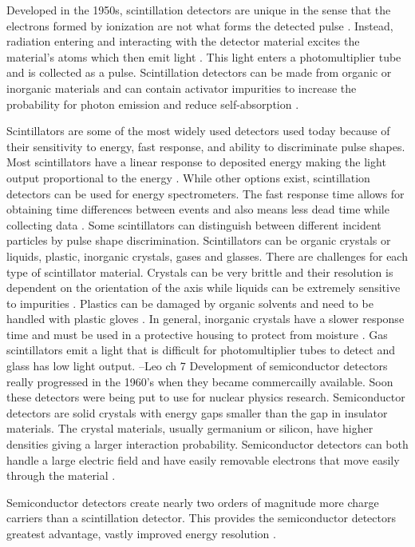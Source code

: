 Developed in the 1950s, scintillation detectors are unique in the sense that the electrons formed by ionization are not what forms the detected pulse \cite{KK88}. Instead, radiation entering and interacting with the detector material excites the material's atoms which then emit light \cite{KK88}. This light enters a photomultiplier tube and is collected as a pulse. Scintillation detectors can be made from organic or inorganic materials and can contain activator impurities to increase the probability for photon emission and reduce self-absorption \cite{KK88}. 

Scintillators are some of the most widely used detectors used today because of their sensitivity to energy, fast response, and ability to discriminate pulse shapes. Most scintillators have a linear response to deposited energy making the light output proportional to the energy \cite{Leo94}. While other options exist, scintillation detectors can be used for energy spectrometers. The fast response time allows for obtaining time differences between events and also means less dead time while collecting data \cite{Leo94}. Some scintillators can distinguish between different incident particles by pulse shape discrimination. Scintillators can be organic crystals or liquids, plastic, inorganic crystals, gases and glasses. There are challenges for each type of scintillator material. Crystals can be very brittle and their resolution is dependent on the orientation of the axis while liquids can be extremely sensitive to impurities \cite{Leo94}. Plastics can be damaged by organic solvents and need to be handled with plastic gloves \cite{Leo94}. In general, inorganic crystals have a slower response time and must be used in a protective housing to protect from moisture \cite{Leo94}. Gas scintillators emit a light that is difficult for photomultiplier tubes to detect and glass has low light output.
--Leo ch 7
Development of semiconductor detectors really progressed in the 1960's when they became commercailly available. Soon these detectors were being put to use for nuclear physics research. Semiconductor detectors are solid crystals with energy gaps smaller than the gap in insulator materials. The crystal materials, usually germanium or silicon, have higher densities giving a larger interaction probability. Semiconductor detectors can both handle a large electric field and have easily removable electrons that move easily through the material \cite{KK88}. 

Semiconductor detectors create nearly two orders of magnitude more charge carriers than a scintillation detector. This provides the semiconductor detectors greatest advantage, vastly improved energy resolution \cite{Leo94}.

